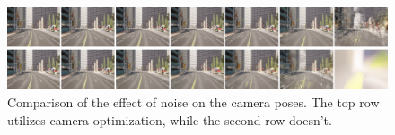 \begin{figure}[!h]
    \centering
    \includegraphics[width=1.0\textwidth]{figures/noise-short-segments.png}
    \caption{Comparison of the effect of noise on the camera poses. The top row utilizes camera optimization, while the second row doesn't.}
    \label{fig:noise-short-segments}
\end{figure}